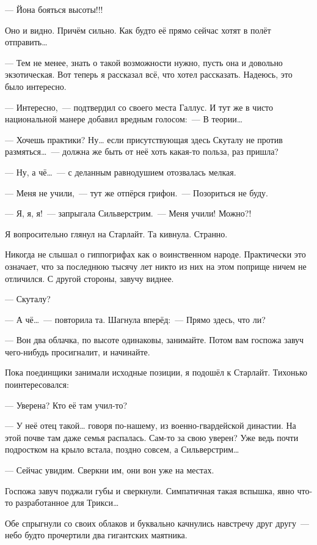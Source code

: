 \documentclass[fontsize=11pt,a5paper,titlepage=firstcover]{scrbook}
\begin{document}
--- Йона бояться высоты!!!

Оно и видно. Причём сильно. Как будто её прямо сейчас хотят в полёт отправить{\ldots}

--- Тем не менее, знать о такой возможности нужно, пусть она и довольно экзотическая. Вот теперь я рассказал всё, что хотел рассказать. Надеюсь, это было интересно.

--- Интересно,~--- подтвердил со своего места Галлус. И тут же в чисто национальной манере добавил вредным голосом:~--- В теории{\ldots}

--- Хочешь практики? Ну{\ldots} если присутствующая здесь Скуталу не против размяться{\ldots}~--- должна же быть от неё хоть какая-то польза, раз пришла?

--- Ну, а чё{\ldots}~--- с деланным равнодушием отозвалась мелкая.

--- Меня не учили,~--- тут же отпёрся грифон.~--- Позориться не буду.

--- Я, я, я!~--- запрыгала Сильверстрим.~--- Меня учили! Можно?!

Я вопросительно глянул на Старлайт. Та кивнула. Странно.

Никогда не слышал о гиппогрифах как о воинственном народе. Практически это означает, что за последнюю тысячу лет никто из них на этом поприще ничем не отличился. С другой стороны, завучу виднее.

--- Скуталу?

--- А чё{\ldots}~--- повторила та. Шагнула вперёд:~--- Прямо здесь, что ли?

--- Вон два облачка, по высоте одинаковы, занимайте. Потом вам госпожа завуч чего-нибудь просигналит, и начинайте.

Пока поединщики занимали исходные позиции, я подошёл к Старлайт. Тихонько поинтересовался:

--- Уверена? Кто её там учил-то?

--- У неё отец такой{\ldots} говоря по-нашему, из военно-гвардейской династии. На этой почве там даже семья распалась. Сам-то за свою уверен? Уже ведь почти подростком на крыло встала, поздно совсем, а Сильверстрим{\ldots}

--- Сейчас увидим. Сверкни им, они вон уже на местах.

Госпожа завуч поджали губы и сверкнули. Симпатичная такая вспышка, явно что-то разработанное для Трикси{\ldots}

Обе спрыгнули со своих облаков и буквально качнулись навстречу друг другу~--- небо будто прочертили два гигантских маятника.
\end{document}
